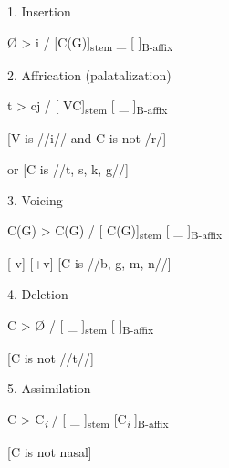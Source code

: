 \ea\label{ex:8-13}
  1.  Insertion

    Ø  >  i  /  [C(G)]\textsubscript{stem}  \_  [   ]\textsubscript{B-affix}

  2.  Affrication (palatalization)

    t  >  cj  /  [   VC]\textsubscript{stem}  [ \_  ]\textsubscript{B-affix}

            [V is //i// and C is not /r/]

or [C is //t, s, k, g//]

  3.  Voicing

    C(G)  >  C(G)  /  [   C(G)]\textsubscript{stem}  [ \_  ]\textsubscript{B-affix}

    [-v]    [+v]    [C is //b, g, m, n//]

  4.  Deletion

    C  >  Ø  /  [   \_ ]\textsubscript{stem}  [   ]\textsubscript{B-affix}

    [C is not //t//]

  5.  Assimilation

    C  >  C\textit{\textsubscript{i}}  /  [   \_ ]\textsubscript{stem}  [C\textit{\textsubscript{i}}  ]\textsubscript{B-affix}

    [C is not nasal]
\z

